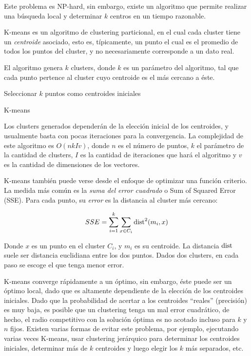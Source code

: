     Este problema es NP-hard, sin embargo, existe un algoritmo que
    permite realizar una búsqueda local y determinar $k$ centros
    en un tiempo razonable.

    K-means\cite{Lloyd:2006:LSQ:2263356.2269955} es un algoritmo de
    clustering particional, en el cual cada cluster tiene un
    \emph{centroide} asociado, esto es, típicamente, un punto
    el cual es el promedio de todos los puntos del cluster, y no
    necesariamente corresponde a un dato real.

    El algoritmo genera $k$ clusters, donde $k$ es un parámetro del
    algoritmo, tal que cada punto pertence al cluster cuyo centroide es el
    más cercano a éste.

\begin{algorithm}[H]
 Seleccionar $k$ puntos como centroides iniciales\;
 \caption{K-means}
\end{algorithm}

    Los clusters generados dependerán de la elección inicial de los
    centroides, y usualmente basta con pocas iteraciones para la
    convergencia. La complejidad de este algoritmo es $O(nkIv)$, donde $n$
    es el número de puntos, $k$ el parámetro de la cantidad de clusters,
    $I$ es la cantidad de iteraciones que hará el algoritmo y $v$ es la
    cantidad de dimensiones de los vectores.

    K-means también puede verse desde el enfoque de optimizar una
    función criterio. La medida más común es la
    \emph{suma del error cuadrado} o Sum of Squared Error (SSE). Para cada
    punto, su \emph{error} es la distancia al cluster más cercano:

    $$SSE = \sum_{i=1}^k\sum_{x\in C_i} \operatorname{dist}^2(m_i,x)$$

    Donde $x$ es un punto en el cluster $C_i$, y $m_i$ es su
    centroide. La distancia $\operatorname{dist}$ suele ser distancia euclidiana
    entre los dos puntos. Dados dos clusters, en cada paso se escoge
    el que tenga menor error.

    K-means converge rápidamente a un óptimo, sin embargo, éste puede
    ser un óptimo local, dado que es altamente dependiente de la
    elección de los centroides iniciales. Dado que la probabilidad de
    acertar a los centroides
    ``reales'' (precisión) es muy baja, es posible que un clustering
    tenga un mal error cuadrático, de hecho, el radio competitivo con
    la solución óptima es no acotado incluso para $k$ y $n$ fijos.
    Existen varias formas de evitar
    este problema, por ejemplo, ejecutando varias veces K-means,
    usar clustering jerárquico para determinar los centroides
    iniciales, determinar más de $k$ centroides y luego elegir los $k$
    más separados, etc.

